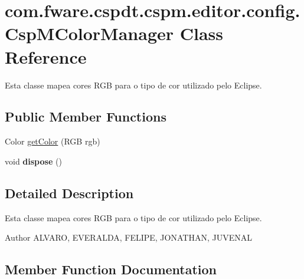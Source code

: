 \hypertarget{classcom_1_1fware_1_1cspdt_1_1cspm_1_1editor_1_1config_1_1_csp_m_color_manager}{}\section{com.\+fware.\+cspdt.\+cspm.\+editor.\+config.\+Csp\+M\+Color\+Manager Class Reference}
\label{classcom_1_1fware_1_1cspdt_1_1cspm_1_1editor_1_1config_1_1_csp_m_color_manager}


Esta classe mapea cores R\+GB para o tipo de cor utilizado pelo Eclipse.  


\subsection*{Public Member Functions}
\begin{DoxyCompactItemize}
\item 
Color \hyperlink{classcom_1_1fware_1_1cspdt_1_1cspm_1_1editor_1_1config_1_1_csp_m_color_manager_a25d5ae3a92eace068a67261367e802bb}{get\+Color} (R\+GB rgb)
\item 
\mbox{\label{classcom_1_1fware_1_1cspdt_1_1cspm_1_1editor_1_1config_1_1_csp_m_color_manager_a39652bdbb5c1bf2a5b213e17c35104ef}} 
void {\bfseries dispose} ()
\end{DoxyCompactItemize}


\subsection{Detailed Description}
Esta classe mapea cores R\+GB para o tipo de cor utilizado pelo Eclipse. 

\begin{DoxyAuthor}{Author}
A\+L\+V\+A\+RO, E\+V\+E\+R\+A\+L\+DA, F\+E\+L\+I\+PE, J\+O\+N\+A\+T\+H\+AN, J\+U\+V\+E\+N\+AL 
\end{DoxyAuthor}


\subsection{Member Function Documentation}
\mbox{\label{classcom_1_1fware_1_1cspdt_1_1cspm_1_1editor_1_1config_1_1_csp_m_color_manager_a25d5ae3a92eace068a67261367e802bb}} 

